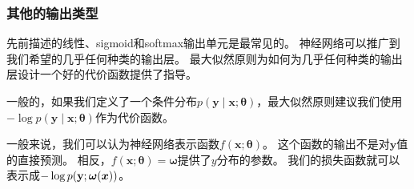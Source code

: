 
\subsubsection{其他的输出类型}
\label{sec:other_output_types}

先前描述的线性、sigmoid和softmax输出单元是最常见的。
神经网络可以推广到我们希望的几乎任何种类的输出层。
最大似然原则为如何为几乎任何种类的输出层设计一个好的代价函数提供了指导。

一般的，如果我们定义了一个条件分布$p(\bm{y}\mid\bm{x}; \bm{\theta})$，最大似然原则建议我们使用$-\log p(\bm{y}\mid \bm{x};\bm{\theta})$作为代价函数。

一般来说，我们可以认为神经网络表示函数$f(\bm{x};\bm{\theta})$。
这个函数的输出不是对$\bm{y}$值的直接预测。
相反，$f(\bm{x};\bm{\theta})=\bm{\omega}$提供了$y$分布的参数。
我们的损失函数就可以表示成$-\log p(\mathbf{y}; \bm{\omega}(\bm{x}))$。

